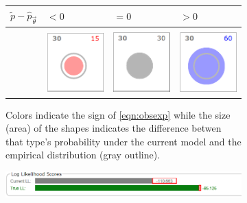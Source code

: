\documentclass[11pt,letterpaper]{article}
\newcommand{\empirical}[0]{\ensuremath{\tilde{p}}}
\begin{document}
\begin{figure}[t]
\begin{center}
\begin{subfigure}[b]{\columnwidth}
\begin{tabular}{
>{\centering\arraybackslash}m{} | 
>{\centering\arraybackslash}m{}
>{\centering\arraybackslash}m{}
>{\centering\arraybackslash}m{}}
$\empirical{} - \hat{p}_{\vec{\theta}} $
& $<0$ & $= 0$ & $> 0$\\\hline\hline \\
& \includegraphics[scale=.25]{images/goldilocks-circle-small.PNG}
& \includegraphics[scale=.25]{images/goldilocks-circle-justright.PNG}
& \includegraphics[scale=.25]{images/goldilocks-circle-large.PNG}\\
\end{tabular}

\caption{Colors indicate the sign of \eqref{eqn:obsexp} while the size (area) of the shapes indicates the difference betwen that type's probability under the current model and the empirical distribution (gray outline).}
\label{fig:colorsize_inventory}
\end{subfigure}

\vspace{1em}
\begin{subfigure}[b]{\columnwidth}
\centering
\includegraphics[scale=.3]{images/regularized_ll_bar_andtrue_cut.PNG}


\end{subfigure}
\end{center}
\end{figure}
\end{document}
